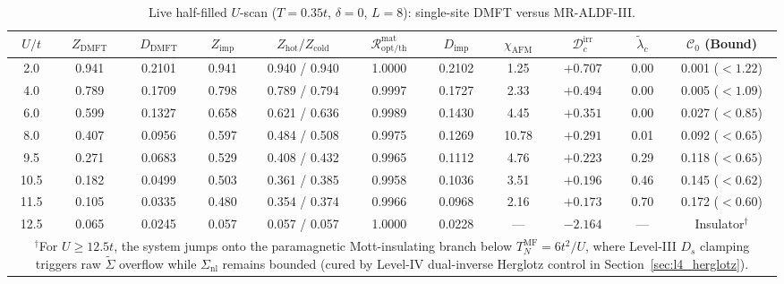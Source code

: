 \documentclass[11pt,a4paper]{article}
\numberwithin{equation}{section}
\theoremstyle{plain}
\theoremstyle{definition}
\begin{document}
\begin{table}[htbp]
\centering
\renewcommand{\arraystretch}{1.16}
\caption{Live half-filled $U$-scan ($T = 0.35t$, $\delta = 0$, $L = 8$): single-site DMFT versus MR-ALDF-III.}
\label{tab:live_s45}
\vspace{0.4em}
\footnotesize
\setlength{\tabcolsep}{4.5pt}
\begin{tabular}{ccccccccccc}
\toprule
$U/t$ & $Z_{\mathrm{DMFT}}$ & $D_{\mathrm{DMFT}}$ & $Z_{\mathrm{imp}}$ & $Z_{\mathrm{hot}}/Z_{\mathrm{cold}}$ & $\mathcal{R}_{\mathrm{opt/th}}^{\mathrm{mat}}$ & $D_{\mathrm{imp}}$ & $\chi_{\mathrm{AFM}}$ & $\mathcal{D}_c^{\mathrm{irr}}$ & $\tilde{\lambda}_c$ & $\mathcal{C}_0$ (Bound) \\
\midrule
2.0  & 0.941 & 0.2101 & 0.941 & 0.940 / 0.940 & 1.0000 & 0.2102 &  1.25 & $+0.707$ & 0.00 & 0.001 ($<1.22$) \\
4.0  & 0.789 & 0.1709 & 0.798 & 0.789 / 0.794 & 0.9997 & 0.1727 &  2.33 & $+0.494$ & 0.00 & 0.005 ($<1.09$) \\
6.0  & 0.599 & 0.1327 & 0.658 & 0.621 / 0.636 & 0.9989 & 0.1430 &  4.45 & $+0.351$ & 0.00 & 0.027 ($<0.85$) \\
8.0  & 0.407 & 0.0956 & 0.597 & 0.484 / 0.508 & 0.9975 & 0.1269 & 10.78 & $+0.291$ & 0.01 & 0.092 ($<0.65$) \\
9.5  & 0.271 & 0.0683 & 0.529 & 0.408 / 0.432 & 0.9965 & 0.1112 &  4.76 & $+0.223$ & 0.29 & 0.118 ($<0.65$) \\
10.5 & 0.182 & 0.0499 & 0.503 & 0.361 / 0.385 & 0.9958 & 0.1036 &  3.51 & $+0.196$ & 0.46 & 0.145 ($<0.62$) \\
11.5 & 0.105 & 0.0335 & 0.480 & 0.354 / 0.374 & 0.9966 & 0.0968 &  2.16 & $+0.173$ & 0.70 & 0.172 ($<0.60$) \\
12.5 & 0.065 & 0.0245 & 0.057 & 0.057 / 0.057 & 1.0000 & 0.0228 & ---   & $-2.164$ & ---  & Insulator$^\dagger$ \\
\bottomrule
\multicolumn{11}{p{15.2cm}}{\scriptsize $^\dagger$For $U \ge 12.5t$, the system jumps onto the paramagnetic Mott-insulating branch below $T_N^{\mathrm{MF}} = 6t^2/U$, where Level-III $D_s$ clamping triggers raw $\tilde{\Sigma}$ overflow while $\Sigma_{\mathrm{nl}}$ remains bounded (cured by Level-IV dual-inverse Herglotz control in Section~\ref{sec:l4_herglotz}).}
\end{tabular}
\end{table}
\end{document}
